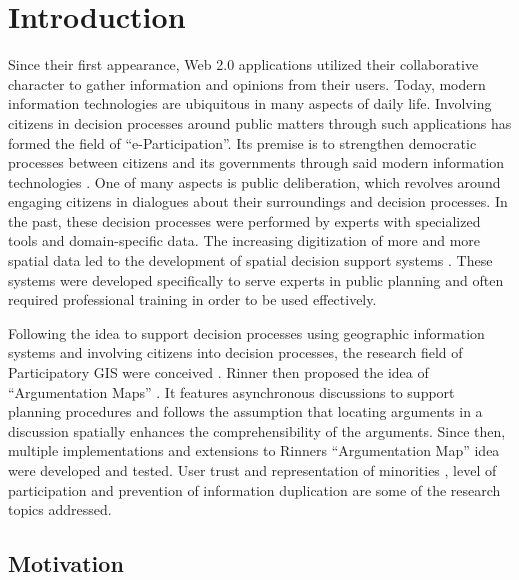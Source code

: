 \section{Introduction}
Since their first appearance, Web 2.0 applications utilized their collaborative character to gather information and opinions from their users. Today, modern information technologies are ubiquitous in many aspects of daily life. Involving citizens in decision processes around public matters through such applications has formed the field of ``e-Participation''. Its premise is to strengthen democratic processes between citizens and its governments through said modern information technologies \cite{Saebo_eParticipation, Medaglia2012_eParticipation}. One of many aspects is public deliberation, which revolves around engaging citizens in dialogues about their surroundings and decision processes. In the past, these decision processes were performed by experts with specialized tools and domain-specific data. The increasing digitization of more and more spatial data led to the development of spatial decision support systems \cite{densham_sdss}. These systems were developed specifically to serve experts in public planning and often required professional training in order to be used effectively.

Following the idea to support decision processes using geographic information systems and involving citizens into decision processes, the research field of Participatory GIS were conceived \cite{Macintosh2004_eParticipation_characterization,Sieber2006_PublicParticipationGIS}. Rinner then proposed the idea of ``Argumentation Maps'' \cite{Rinner_ArgumentationMaps}. It features asynchronous discussions to support planning procedures and follows the assumption that locating arguments in a discussion spatially enhances the comprehensibility of the arguments. Since then, multiple implementations and extensions to Rinners ``Argumentation Map'' idea were developed and tested. User trust and representation of minorities \cite{Carver2001_PPGIS_Cyberdemocracy}, level of participation \cite{Steinmann2005_Combination_Ladder_GIS} and prevention of information duplication \cite{Hopfer2007_Communication} are some of the research topics addressed.

\subsection{Motivation}